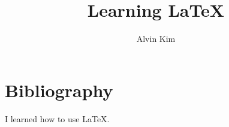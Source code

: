 \documentclass{article}
\title{Learning \LaTeX}
\author{Alvin Kim}
\begin{document}
    \maketitle

    \section{Bibliography}
    I learned how to use \LaTeX. \cite{LatexExercises}

    
    
\end{document}
